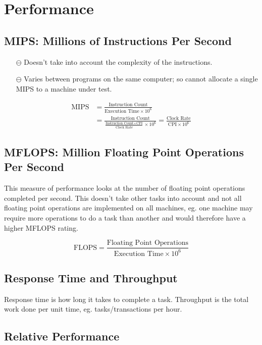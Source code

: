 \section{Performance}

\subsection{MIPS: Millions of Instructions Per Second}

\begin{itemize}
    \item[$\ominus$] Doesn't take into account the complexity of the instructions.
    \item[$\ominus$] Varies between programs on the same computer; so cannot allocate a single MIPS to a machine under test.
\end{itemize}
\begin{align*}
    \mbox{MIPS}&=\frac{\mbox{Instruction Count}}{\mbox{Execution Time}\times 10^6} \\
    & = \frac{\mbox{Instruction Count}}{\frac{\mbox{Instruction Count$\times$CPI}}{\mbox{Clock Rate}}\times 10^6} = \frac{\mbox{Clock Rate}}{\mbox{CPI}\times 10^6}
\end{align*}

\subsection{MFLOPS: Million Floating Point Operations Per Second}

This measure of performance looks at the number of floating point operations completed per second. This doesn't take other tasks into account and not all floating point operations are implemented on all machines, eg. one machine may require more operations to do a task than another and would therefore have a higher MFLOPS rating.

\begin{equation*}
    \mbox{FLOPS} = \frac{\mbox{Floating Point Operations}}{\mbox{Execution Time}\times 10^6}
\end{equation*}

\subsection{Response Time and Throughput}
Response time is how long it takes to complete a task. Throughput is the total work done per unit time, eg. tasks/transactions per hour.

\subsection{Relative Performance}

